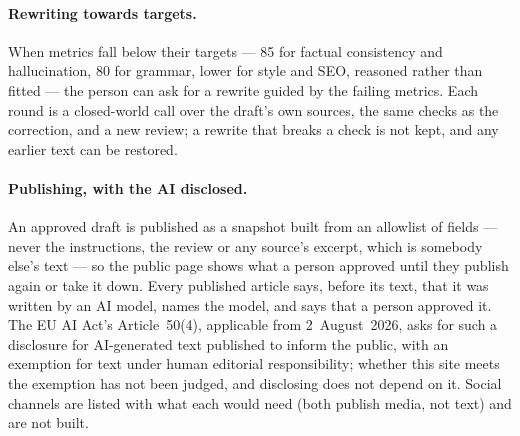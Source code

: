 \paragraph{Rewriting towards targets.} When metrics fall below their
targets --- 85 for factual consistency and hallucination, 80 for
grammar, lower for style and SEO, reasoned rather than fitted --- the
person can ask for a rewrite guided by the failing metrics. Each round
is a closed-world call over the draft's own sources, the same checks as
the correction, and a new review; a rewrite that breaks a check is not
kept, and any earlier text can be restored.

\paragraph{Publishing, with the AI disclosed.} An approved draft is
published as a snapshot built from an allowlist of fields --- never the
instructions, the review or any source's excerpt, which is somebody
else's text --- so the public page shows what a person approved until
they publish again or take it down. Every published article says,
before its text, that it was written by an AI model, names the model,
and says that a person approved it. The EU AI Act's Article~50(4),
applicable from 2~August~2026, asks for such a disclosure for
AI-generated text published to inform the public, with an exemption for
text under human editorial responsibility; whether this site meets the
exemption has not been judged, and disclosing does not depend on it.
Social channels are listed with what each would need (both publish
media, not text) and are not built.

